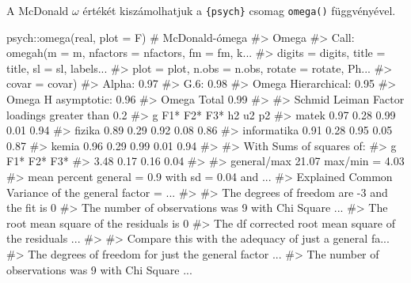 \documentclass[
  letterpaper,
]{krantz}
\makeatletter
\newenvironment{Shaded}{\begin{snugshade}}{\end{snugshade}}
\newcommand{\AttributeTok}[1]{\textcolor[rgb]{0.40,0.45,0.13}{#1}}
\newcommand{\CommentTok}[1]{\textcolor[rgb]{0.37,0.37,0.37}{#1}}
\newcommand{\FunctionTok}[1]{\textcolor[rgb]{0.28,0.35,0.67}{#1}}
\newcommand{\NormalTok}[1]{\textcolor[rgb]{0.00,0.23,0.31}{#1}}
\newcommand{\SpecialCharTok}[1]{\textcolor[rgb]{0.37,0.37,0.37}{#1}}
\newenvironment{kframe}{%
\medskip{}
\setlength{\fboxsep}{.8em}
 \def\at@end@of@kframe{}%
 \ifinner\ifhmode%
  \def\at@end@of@kframe{\end{minipage}}%
  \begin{minipage}{\columnwidth}%
 \fi\fi%
 \def\FrameCommand##1{\hskip\@totalleftmargin \hskip-\fboxsep
 \colorbox{shadecolor}{##1}\hskip-\fboxsep
     \hskip-\linewidth \hskip-\@totalleftmargin \hskip\columnwidth}%
 \MakeFramed {\advance\hsize-\width
   \@totalleftmargin\z@ \linewidth\hsize
   \@setminipage}}%
 {\par\unskip\endMakeFramed%
 \at@end@of@kframe}
\renewenvironment{Shaded}{\begin{kframe}}{\end{kframe}}
\makeatother
\begin{document}
A McDonald \(\omega\) értékét kiszámolhatjuk a \texttt{\{psych\}} csomag
\texttt{omega()} függvényével.

\begin{Shaded}
\begin{Highlighting}[]
\NormalTok{psych}\SpecialCharTok{::}\FunctionTok{omega}\NormalTok{(real, }\AttributeTok{plot =}\NormalTok{ F)  }\CommentTok{\# McDonald{-}ómega}
\CommentTok{\#\textgreater{} Omega }
\CommentTok{\#\textgreater{} Call: omegah(m = m, nfactors = nfactors, fm = fm, k...}
\CommentTok{\#\textgreater{}     digits = digits, title = title, sl = sl, labels...}
\CommentTok{\#\textgreater{}     plot = plot, n.obs = n.obs, rotate = rotate, Ph...}
\CommentTok{\#\textgreater{}     covar = covar)}
\CommentTok{\#\textgreater{} Alpha:                 0.97 }
\CommentTok{\#\textgreater{} G.6:                   0.98 }
\CommentTok{\#\textgreater{} Omega Hierarchical:    0.95 }
\CommentTok{\#\textgreater{} Omega H asymptotic:    0.96 }
\CommentTok{\#\textgreater{} Omega Total            0.99 }
\CommentTok{\#\textgreater{} }
\CommentTok{\#\textgreater{} Schmid Leiman Factor loadings greater than  0.2 }
\CommentTok{\#\textgreater{}                g   F1*   F2*   F3*   h2   u2   p2}
\CommentTok{\#\textgreater{} matek       0.97        0.28       0.99 0.01 0.94}
\CommentTok{\#\textgreater{} fizika      0.89  0.29             0.92 0.08 0.86}
\CommentTok{\#\textgreater{} informatika 0.91        0.28       0.95 0.05 0.87}
\CommentTok{\#\textgreater{} kemia       0.96  0.29             0.99 0.01 0.94}
\CommentTok{\#\textgreater{} }
\CommentTok{\#\textgreater{} With Sums of squares  of:}
\CommentTok{\#\textgreater{}    g  F1*  F2*  F3* }
\CommentTok{\#\textgreater{} 3.48 0.17 0.16 0.04 }
\CommentTok{\#\textgreater{} }
\CommentTok{\#\textgreater{} general/max  21.07   max/min =   4.03}
\CommentTok{\#\textgreater{} mean percent general =  0.9    with sd =  0.04 and ...}
\CommentTok{\#\textgreater{} Explained Common Variance of the general factor =  ...}
\CommentTok{\#\textgreater{} }
\CommentTok{\#\textgreater{} The degrees of freedom are {-}3  and the fit is  0 }
\CommentTok{\#\textgreater{} The number of observations was  9  with Chi Square ...}
\CommentTok{\#\textgreater{} The root mean square of the residuals is  0 }
\CommentTok{\#\textgreater{} The df corrected root mean square of the residuals ...}
\CommentTok{\#\textgreater{} }
\CommentTok{\#\textgreater{} Compare this with the adequacy of just a general fa...}
\CommentTok{\#\textgreater{} The degrees of freedom for just the general factor ...}
\CommentTok{\#\textgreater{} The number of observations was  9  with Chi Square ...}

\end{Highlighting}
\end{Shaded}
\end{document}
